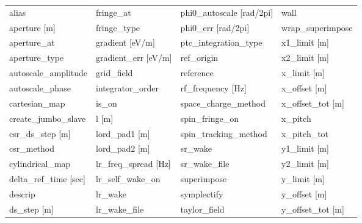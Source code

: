  \begin{tabular}{llll} \toprule
alias                            & fringe_at                        & phi0_autoscale [rad/2pi]         & wall                             \\
aperture [m]                     & fringe_type                      & phi0_err [rad/2pi]               & wrap_superimpose                 \\
aperture_at                      & gradient [eV/m]                  & ptc_integration_type             & x1_limit [m]                     \\
aperture_type                    & gradient_err [eV/m]              & ref_origin                       & x2_limit [m]                     \\
autoscale_amplitude              & grid_field                       & reference                        & x_limit [m]                      \\
autoscale_phase                  & integrator_order                 & rf_frequency [Hz]                & x_offset [m]                     \\
cartesian_map                    & is_on                            & space_charge_method              & x_offset_tot [m]                 \\
create_jumbo_slave               & l [m]                            & spin_fringe_on                   & x_pitch                          \\
csr_ds_step [m]                  & lord_pad1 [m]                    & spin_tracking_method             & x_pitch_tot                      \\
csr_method                       & lord_pad2 [m]                    & sr_wake                          & y1_limit [m]                     \\
cylindrical_map                  & lr_freq_spread [Hz]              & sr_wake_file                     & y2_limit [m]                     \\
delta_ref_time [sec]             & lr_self_wake_on                  & superimpose                      & y_limit [m]                      \\
descrip                          & lr_wake                          & symplectify                      & y_offset [m]                     \\
ds_step [m]                      & lr_wake_file                     & taylor_field                     & y_offset_tot [m]                 \\

\end{tabular}
